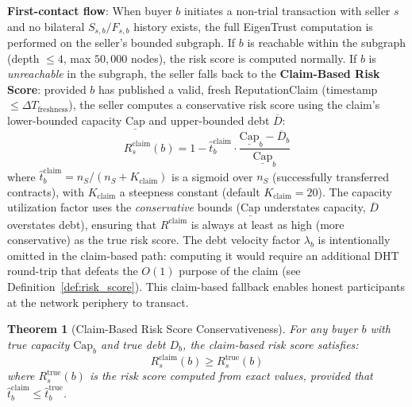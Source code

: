 \documentclass[11pt]{article}
\newtheorem{theorem}{Theorem}[section]
\begin{document}
\textbf{First-contact flow}: When buyer $b$ initiates a non-trial transaction with seller $s$ and no bilateral $S_{s,b}/F_{s,b}$ history exists, the full EigenTrust computation is performed on the seller's bounded subgraph. If $b$ is reachable within the subgraph (depth $\leq 4$, max $50{,}000$ nodes), the risk score is computed normally. If $b$ is \emph{unreachable} in the subgraph, the seller falls back to the \textbf{Claim-Based Risk Score}: provided $b$ has published a valid, fresh ReputationClaim (timestamp $\leq \Delta T_{\text{freshness}}$), the seller computes a conservative risk score using the claim's lower-bounded capacity $\underline{\text{Cap}}$ and upper-bounded debt $\overline{D}$:
\begin{equation}\label{eq:claim_risk}
    R^{\text{claim}}_s(b) = 1 - \hat{t}^{\text{claim}}_b \cdot \frac{\underline{\text{Cap}}_b - \overline{D}_b}{\underline{\text{Cap}}_b}
\end{equation}
where $\hat{t}^{\text{claim}}_b = n_S / (n_S + K_{\text{claim}})$ is a sigmoid over $n_S$ (successfully transferred contracts), with $K_{\text{claim}}$ a steepness constant (default $K_{\text{claim}} = 20$). The capacity utilization factor uses the \emph{conservative} bounds ($\underline{\text{Cap}}$ understates capacity, $\overline{D}$ overstates debt), ensuring that $R^{\text{claim}}$ is always at least as high (more conservative) as the true risk score. The debt velocity factor $\lambda_b$ is intentionally omitted in the claim-based path: computing it would require an additional DHT round-trip that defeats the $O(1)$ purpose of the claim (see Definition~\ref{def:risk_score}). This claim-based fallback enables honest participants at the network periphery to transact.

\begin{theorem}[Claim-Based Risk Score Conservativeness]\label{thm:claim_conservative}
For any buyer $b$ with true capacity $\text{Cap}_b$ and true debt $D_b$, the claim-based risk score satisfies:
\begin{equation}
    R^{\text{claim}}_s(b) \geq R^{\text{true}}_s(b)
\end{equation}
where $R^{\text{true}}_s(b)$ is the risk score computed from exact values, \emph{provided} that $\hat{t}^{\text{claim}}_b \leq \hat{t}^{\text{true}}_b$.
\end{theorem}
\end{document}
